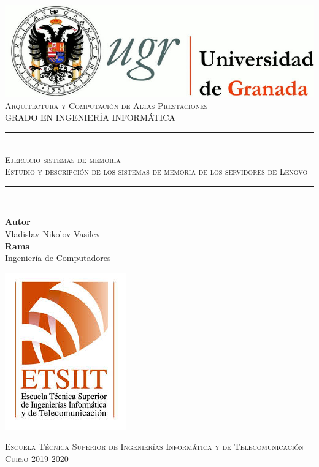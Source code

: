 \documentclass[11pt,a4paper]{article}
\newcommand{\asignatura}{Arquitectura y Computación de Altas Prestaciones}
\newcommand{\autor}{Vladislav Nikolov Vasilev}
\newcommand{\titulo}{Ejercicio sistemas de memoria}
\newcommand{\subtitulo}{Estudio y descripción de los sistemas de memoria de los servidores de Lenovo}
\newcommand{\rama}{Ingeniería de Computadores}
\begin{document}

\begin{titlepage}

\begin{minipage}{\textwidth}

\centering

\includegraphics[scale=0.3]{img/logo_ugr.jpg}\\[1cm]

\textsc{\Large \asignatura{}\\[0.2cm]}
\textsc{GRADO EN INGENIERÍA INFORMÁTICA}\\[1cm]

\noindent\rule[-1ex]{\textwidth}{1pt}\\[1.5ex]
\textsc{{\Huge \titulo\\[0.5ex]}}
\textsc{{\Large \subtitulo\\}}
\noindent\rule[-1ex]{\textwidth}{2pt}\\[3.5ex]

\end{minipage}

\vspace{0.7cm}

\begin{minipage}{\textwidth}

\centering

\textbf{Autor}\\ {\autor{}}\\[2.5ex]
\textbf{Rama}\\ {\rama}\\[2.5ex]
\vspace{0.3cm}

\includegraphics[scale=0.3]{img/etsiit.jpeg}

\vspace{0.7cm}
\textsc{Escuela Técnica Superior de Ingenierías Informática y de Telecomunicación}\\
\vspace{1cm}
\textsc{Curso 2019-2020}
\end{minipage}
\end{titlepage}
\end{document}
